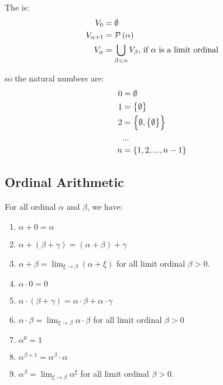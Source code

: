 The  is:
\begin{equation}
    \begin{aligned}
        V_0 &= \emptyset \\
        V_{\alpha + 1} &= \mathcal{P}\left( \alpha \right) \\
        V_{\alpha} &= \bigcup_{\beta < \alpha} V_\beta \text{, if } \alpha \text{ is a limit ordinal}
    \end{aligned}
\end{equation}


so the natural numbers are:
\begin{equation*}
    \begin{aligned}
        0 &= \emptyset \\
        1 &= \set{\emptyset} \\
        2 &= \set{\emptyset, \set{\emptyset}} \\
        &... \\
        n &= \set{1, 2, ..., n-1}
    \end{aligned}
\end{equation*}



\subsection{Ordinal Arithmetic}

\begin{theorem}
    For all ordinal $\alpha$ and $\beta$, we have:
    \begin{enumerate}
        \item $\alpha + 0 = \alpha$
        \item $\alpha + (\beta + \gamma) = (\alpha + \beta) + \gamma$
        \item $\displaystyle \alpha + \beta = \lim_{\xi \rightarrow \beta} (\alpha + \xi)$ for all limit ordinal $\beta > 0$.
        \item $\alpha \cdot 0 = 0$
        \item $\alpha \cdot (\beta + \gamma) = \alpha \cdot \beta + \alpha \cdot \gamma$
        \item $\displaystyle \alpha \cdot \beta = \lim_{\xi \rightarrow \beta} \alpha \cdot \beta$ for all limit ordinal $\beta > 0$
        \item $\alpha^0 = 1$
        \item $\alpha^{\beta + 1} = \alpha^\beta \cdot \alpha$
        \item $\displaystyle \alpha^\beta = \lim_{\xi \rightarrow \beta} \alpha^\xi$ for all limit ordinal $\beta > 0$.
    \end{enumerate}    
\end{theorem}

